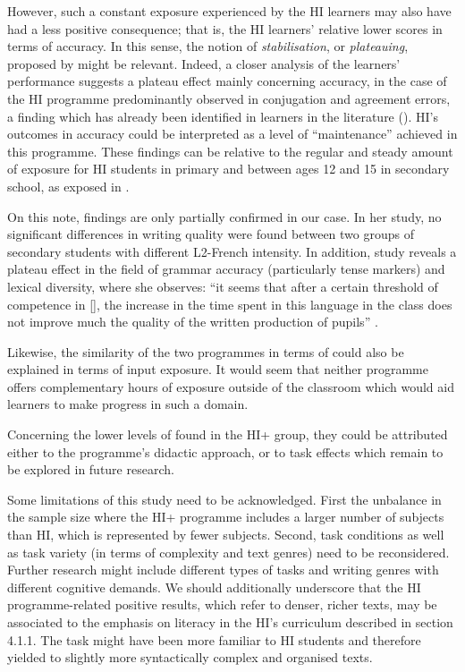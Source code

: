 \documentclass[output=paper]{langsci/langscibook}
\begin{document}
However, such a constant exposure experienced by the HI learners may also have had a less positive consequence; that is, the HI learners’ relative lower scores in terms of  accuracy. In this sense, the notion of \textit{stabilisation}, or \textit{plateauing}, proposed by \citet{Long2008} might be relevant. Indeed, a closer analysis of the learners’ performance suggests a plateau effect mainly concerning  accuracy, in the case of the HI programme predominantly observed in conjugation and agreement errors, a finding which has already been identified in  learners in the literature (\citealt{Rifkin2005,HartEtAl1991}). HI’s outcomes in accuracy could be interpreted as a level of ``maintenance'' achieved in this programme. These findings can be relative to the regular and steady amount of exposure for HI students in primary and between ages 12 and 15 in secondary school, as exposed in .

On this note,  findings are only partially confirmed in our case. In her study, no significant differences in writing quality were found between two groups of secondary  students with different L2-French intensity. In addition,  study reveals a plateau effect in the field of grammar accuracy (particularly tense markers) and lexical diversity, where she observes: ``it seems that after a certain threshold of competence in [], the increase in the time spent in this language in the class does not improve much the quality of the written production of pupils'' \citep[20]{Bournot-Trites2007}.  

Likewise, the similarity of the two programmes in terms of  could also be explained in terms of input exposure. It would seem that neither programme offers complementary hours of exposure outside of the classroom which would aid learners to make progress in such a domain. 

Concerning the lower levels of  found in the HI+ group, they could be attributed either to the programme’s didactic approach, or to task effects which remain to be explored in future research.  

Some limitations of this study need to be acknowledged. First the unbalance in the sample size where the HI+ programme includes a larger number of subjects than HI, which is represented by fewer subjects. Second, task conditions as well as task variety (in terms of complexity and text genres) need to be reconsidered. Further research might include different types of tasks and writing genres with different cognitive demands. We should additionally underscore that the HI programme-related positive results, which refer to denser, richer texts, may be associated to the emphasis on literacy in the HI’s curriculum described in section 4.1.1. The task might have been more familiar to HI students and therefore yielded to slightly more syntactically complex and organised texts. 
\end{document}
